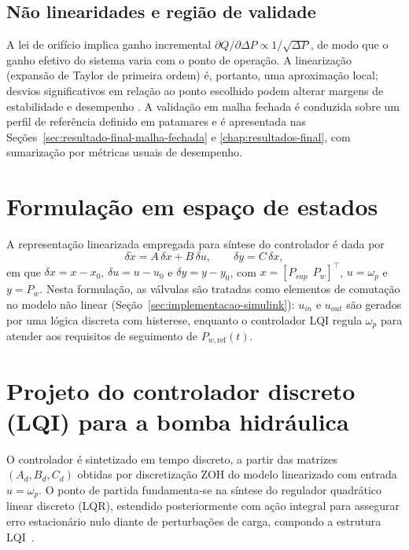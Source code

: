 \subsection{Não linearidades e região de validade}
A lei de orifício implica ganho incremental $\partial Q/\partial \Delta P \propto 1/\sqrt{\Delta P}$, de modo que o ganho efetivo do sistema varia com o ponto de operação. A linearização (expansão de Taylor de primeira ordem) é, portanto, uma aproximação local; desvios significativos em relação ao ponto escolhido podem alterar margens de estabilidade e desempenho \cite{FranklinPowellWorkman1998}. A validação em malha fechada é conduzida sobre um perfil de referência definido em patamares e é apresentada nas Seções~\ref{sec:resultado-final-malha-fechada} e \ref{chap:resultados-final}, com sumarização por métricas usuais de desempenho.
\section{Formulação em espaço de estados}
\label{sec:controle-formulacao-espaço-estados}
A representação linearizada empregada para síntese do controlador é dada por
\[
    \delta\dot{x} = A\,\delta x + B\,\delta u, \qquad \delta y = C\,\delta x,
\]
em que $\delta x = x-x_0$, $\delta u = u-u_0$ e $\delta y = y-y_0$, com $x=[P_{sup}\ \ P_w]^\top$, $u=\omega_p$ e $y=P_w$. Nesta formulação, as válvulas são tratadas como elementos de comutação no modelo não linear (Seção~\ref{sec:implementacao-simulink}): $u_{in}$ e $u_{out}$ são gerados por uma lógica discreta com histerese, enquanto o controlador LQI regula $\omega_p$ para atender aos requisitos de seguimento de $P_{w,\text{ref}}(t)$.
\section{Projeto do controlador discreto (LQI) para a bomba hidráulica}
\label{sec:controle-lqr-luenberger}
O controlador é sintetizado em tempo discreto, a partir das matrizes $(A_d,B_d,C_d)$ obtidas por discretização ZOH do modelo linearizado com entrada $u=\omega_p$. O ponto de partida fundamenta-se na síntese do regulador quadrático linear discreto (LQR), estendido posteriormente com ação integral para assegurar erro estacionário nulo diante de perturbações de carga, compondo a estrutura LQI~\cite{FranklinPowellWorkman1998,Ogata1997,BrunoAAngelico2018}.

